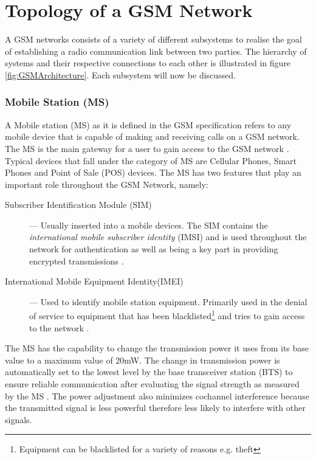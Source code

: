 \section{Topology of a GSM Network}
\label{sec:GSMArch}
A GSM networks consists of a variety of different subsystems to realise the goal of establishing a radio communication link between two parties. The hierarchy of systems and their respective connections to each other is illustrated in figure \ref{fig:GSMArchitecture}. Each subsystem will now be discussed.
\subsubsection{Mobile Station (MS)}
A Mobile station (MS) as it is defined in the GSM specification refers to any mobile device that is capable of making and receiving calls on a GSM network.  The MS is the main gateway 
for a user to gain access to the GSM network \cite{Eisenblatter,GSMArchitectureProtocolsServices}. Typical devices that fall under the category of MS are Cellular Phones, Smart Phones and Point of Sale (POS) devices. The MS has two features that play an important role throughout the GSM Network, namely:
\begin{description}
\item[Subscriber Identification Module (SIM)] --- Usually inserted into a mobile devices. The SIM contains the \emph{international mobile subscriber identity} (IMSI) and is used throughout the network for authentication as well as being a key part in providing encrypted transmissions \cite{Eisenblatter}.
\item[International Mobile Equipment Identity(IMEI)] --- Used to identify mobile station equipment. Primarily used in the denial of service to equipment that has been blacklisted\footnote{Equipment can be blacklisted for a variety of reasons e.g. theft} and tries to gain access to the network \cite{Eisenblatter}.
\end{description}
The MS has the capability to change the transmission power it uses from its base value to a maximum value of 20mW. The change in transmission power is automatically set to the lowest level by the base transceiver station (BTS) to ensure reliable communication after evaluating the signal strength as measured by the MS \cite{GSMSysEngin,GSMArchitectureProtocolsServices}. The power adjustment also minimizes cochannel interference because the transmitted signal is less powerful therefore less likely to interfere with other signals\cite{GSMSysEngin}.

